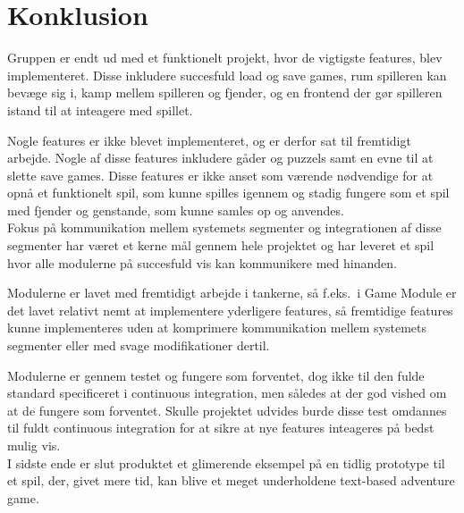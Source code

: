 \section{Konklusion}
Gruppen er endt ud med et funktionelt projekt, hvor de vigtigste features, blev implementeret.
Disse inkludere succesfuld load og save games, rum spilleren kan bevæge sig i, kamp mellem spilleren
og fjender, og en frontend der gør spilleren istand til at inteagere med spillet.

Nogle features er ikke blevet implementeret, og er derfor sat til fremtidigt arbejde.
Nogle af disse features inkludere gåder og puzzels samt en evne til at slette save games.
Disse features er ikke anset som værende nødvendige for at opnå et funktionelt spil, som kunne spilles
igennem og stadig fungere som et spil med fjender og genstande, som kunne samles op og anvendes.\\

\noindent Fokus på kommunikation mellem systemets segmenter og integrationen af disse segmenter har været
et kerne mål gennem hele projektet og har leveret et spil hvor alle modulerne på succesfuld vis kan 
kommunikere med hinanden. 

Modulerne er lavet med fremtidigt arbejde i tankerne, så f.eks.\ i Game Module er det lavet relativt nemt 
at implementere yderligere features, så fremtidige features kunne implementeres uden at komprimere 
kommunikation mellem systemets segmenter eller med svage modifikationer dertil.

Modulerne er gennem testet og fungere som forventet, dog ikke til den fulde standard specificeret i 
continuous integration, men således at der god vished om at de fungere som forventet. Skulle projektet
udvides burde disse test omdannes til fuldt continuous integration for at sikre at nye features
inteageres på bedst mulig vis.\\

I sidste ende er slut produktet et glimerende eksempel på en tidlig prototype til et spil, der, givet mere
tid, kan blive et meget underholdene text-based adventure game.

\newpage
